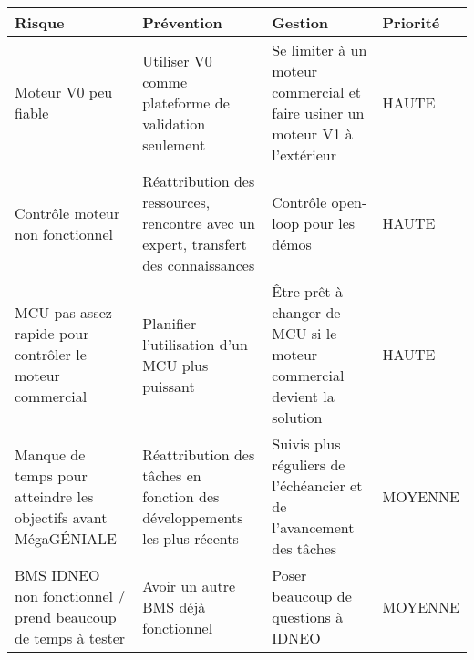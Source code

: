 \begin{tabularx}{\linewidth}{
    |>{\let\newline\\\hsize=0.40\hsize}X|%
    >{\hsize=0.25\hsize}X|%
    >{\hsize=0.25\hsize}X|%
    >{\centering\arraybackslash\hsize=0.1\hsize}X|%
  }
    \hline
    \textbf{Risque} & \textbf{Prévention} & \textbf{Gestion} & \textbf{Priorité}\\\hline
    Moteur V0 peu fiable & Utiliser V0 comme plateforme de validation seulement & Se limiter à un moteur commercial et faire usiner un moteur V1 à l'extérieur & HAUTE\\\hline
    
    Contrôle moteur non fonctionnel & Réattribution des ressources, rencontre avec un expert, transfert des connaissances & Contrôle open-loop pour les démos & HAUTE\\\hline

    MCU pas assez rapide pour contrôler le moteur commercial & Planifier l'utilisation d'un MCU plus puissant & Être prêt à changer de MCU si le moteur commercial devient la solution & HAUTE\\\hline
    
    Manque de temps pour atteindre les objectifs avant MégaGÉNIALE & Réattribution des tâches en fonction des développements les plus récents & Suivis plus réguliers de l'échéancier et de l'avancement des tâches & MOYENNE\\\hline
    
    BMS IDNEO non fonctionnel / prend beaucoup de temps à tester &  Avoir un autre BMS déjà fonctionnel & Poser beaucoup de questions à IDNEO & MOYENNE\\\hline

\end{tabularx}



  
